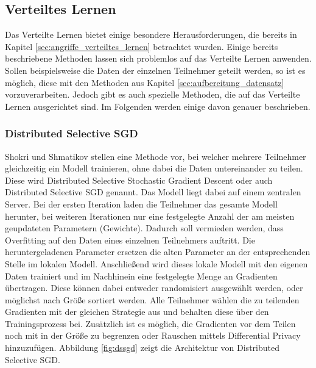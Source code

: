 \subsection{Verteiltes Lernen}\label{sec:verteiltes_lernen}

Das Verteilte Lernen bietet einige besondere Herausforderungen, die bereits in Kapitel \ref{sec:angriffe_verteiltes_lernen} betrachtet wurden. 
Einige bereits beschriebene Methoden lassen sich problemlos auf das Verteilte Lernen anwenden.
Sollen beispielsweise die Daten der einzelnen Teilnehmer geteilt werden, so ist es möglich, diese mit den Methoden aus Kapitel \ref{sec:aufbereitung_datensatz} vorzuverarbeiten.
Jedoch gibt es auch spezielle Methoden, die auf das Verteilte Lernen ausgerichtet sind.
Im Folgenden werden einige davon genauer beschrieben.

\subsubsection*{Distributed Selective SGD}
Shokri und Shmatikov \cite{P-78} stellen eine Methode vor, bei welcher mehrere Teilnehmer gleichzeitig ein Modell trainieren, ohne dabei die Daten untereinander zu teilen.
Diese wird Distributed Selective Stochastic Gradient Descent oder auch Distributed Selective SGD genannt.
Das Modell liegt dabei auf einem zentralen Server.
Bei der ersten Iteration laden die Teilnehmer das gesamte Modell herunter, bei weiteren Iterationen nur eine festgelegte Anzahl der am meisten geupdateten Parametern (Gewichte).
Dadurch soll vermieden werden, dass Overfitting auf den Daten eines einzelnen Teilnehmers auftritt.
Die heruntergeladenen Parameter ersetzen die alten Parameter an der entsprechenden Stelle im lokalen Modell.
Anschließend wird dieses lokale Modell mit den eigenen Daten trainiert und im Nachhinein eine festgelegte Menge an Gradienten übertragen. 
Diese können dabei entweder randomisiert ausgewählt werden, oder möglichst nach Größe sortiert werden.
Alle Teilnehmer wählen die zu teilenden Gradienten mit der gleichen Strategie aus und behalten diese über den Trainingsprozess bei.
Zusätzlich ist es möglich, die Gradienten vor dem Teilen noch mit in der Größe zu begrenzen oder Rauschen mittels Differential Privacy hinzuzufügen.
Abbildung \ref{fig:dssgd} zeigt die Architektur von Distributed Selective SGD.


